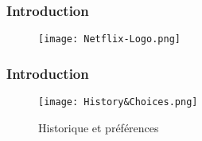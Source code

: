 \begin{frame}

    \frametitle{Introduction}

    \begin{figure}
        \centering
        \texttt{[image: Netflix-Logo.png]}
    \end{figure}

\end{frame}



\begin{frame}

    \frametitle{Introduction}

    \begin{figure}
        \centering
        \texttt{[image: History\&Choices.png]}
        \caption{Historique et préférences}
    \end{figure}

\end{frame}